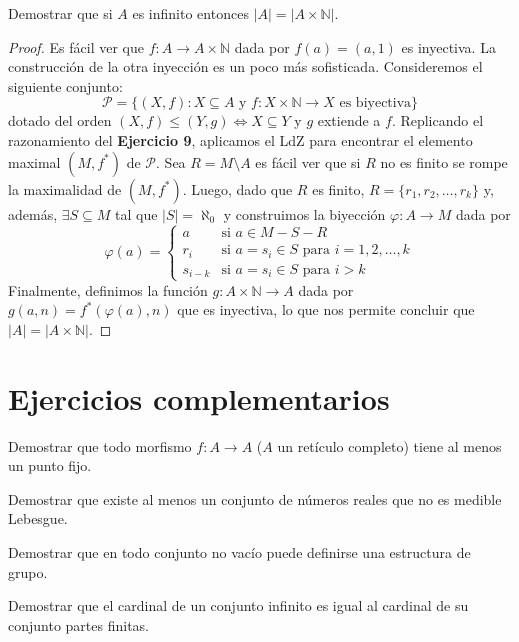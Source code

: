 \documentclass{article}
\theoremstyle{definition}
\newcommand{\N}{\mathbb{N}}
\newenvironment{ejercicio}[1]{\begin{trivlist}
\item[\hskip \labelsep {\bfseries Ejercicio}\hskip \labelsep {\bfseries #1.}]}{\end{trivlist}}
\begin{document}
\begin{ejercicio}{13}
    Demostrar que si \(A\) es infinito entonces \( |A| = |A \times \N| \).
\end{ejercicio}
\begin{proof}
    Es fácil ver que \( f: A \to A \times \N \) dada por \( f(a) = (a, 1) \) es inyectiva. La construcción de la otra inyección es un poco más sofisticada. Consideremos el siguiente conjunto: \[
        \mathcal{P} = \{ (X, f) : X \subseteq A \text{ y } f : X \times \N \to X \text{ es biyectiva} \}
    \]
    dotado del orden \( (X, f) \leq (Y, g) \iff X \subseteq Y \) y \( g \) extiende a \( f \). Replicando el razonamiento del \textbf{Ejercicio 9}, aplicamos el LdZ para encontrar el elemento maximal
    \( (M, f^*) \) de \( \mathcal{P} \). Sea \( R = M \setminus A \) es fácil ver que si \( R \) no es finito se rompe la maximalidad de \( (M, f^*) \). Luego, dado que \( R \) es finito,
    \( R = \{ r_1, r_2, \ldots, r_k \} \) y, además, \( \exists S \subseteq M \) tal que \( |S| = \aleph_0 \) y construimos la biyección \( \varphi: A \to M \) dada por \[
        \varphi(a) = \begin{cases}
            a       & \text{si } a \in M - S - R                                 \\
            r_i     & \text{si } a = s_i \in S \text{ para } i = 1, 2, \ldots, k \\
            s_{i-k} & \text{si } a = s_i \in S \text{ para } i > k
        \end{cases}
    \]
    Finalmente, definimos la función \( g : A \times \N \to A \) dada por \( g(a, n) = f^*(\varphi(a), n) \)
    que es inyectiva, lo que nos permite concluir que \( |A| = |A \times \N| \).
\end{proof}
\section*{Ejercicios complementarios}

\begin{ejercicio}{1}
    Demostrar que todo morfismo \( f:A\rightarrow A\) (\(A \) un retículo completo) tiene al menos un punto fijo.
\end{ejercicio}

\begin{ejercicio}{2}
    Demostrar que existe al menos un conjunto de números reales que no es medible Lebesgue.
\end{ejercicio}

\begin{ejercicio}{3}
    Demostrar que en todo conjunto no vacío puede definirse una estructura de grupo.
\end{ejercicio}

\begin{ejercicio}{4}
    Demostrar que el cardinal de un conjunto infinito es igual al cardinal de su conjunto partes finitas.
\end{ejercicio}
\end{document}
